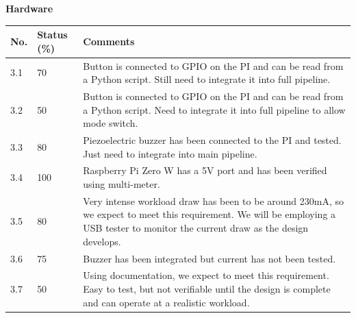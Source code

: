 \documentclass[a4paper,11pt]{article}
\begin{document}
\newpage
\textbf{Hardware}
\begin{table}[ht]
    \centering
    \begin{tabular}{|p{0.7cm}|p{1cm}|p{12cm}|}
        \hline
        No. & Status (\%) & Comments \\ \hline
        
        3.1 & 70 & Button is connected to GPIO on the PI and can be read from a Python script. Still need to integrate it into full pipeline. \\ \hline
        
        3.2 & 50 & Button is connected to GPIO on the PI and can be read from a Python script. Need to integrate it into full pipeline to allow mode switch. \\ \hline
        
        3.3 & 80 & Piezoelectric buzzer has been connected to the PI and tested. Just need to integrate into main pipeline. \\ \hline
        
        3.4 & 100 & Raspberry Pi Zero W has a 5V port and has been verified using multi-meter. \\ \hline
        
        3.5 & 80 & Very intense workload draw has been to be around 230mA, so we expect to meet this requirement. We will be employing a USB tester to monitor the current draw as the design develops. \\ \hline
        
        3.6 & 75 & Buzzer has been integrated but current has not been tested. \\ \hline
        
        3.7 & 50 & Using documentation, we expect to meet this requirement. Easy to test, but not verifiable until the design is complete and can operate at a realistic workload. \\ \hline

    \end{tabular}
\end{table}
\end{document}
